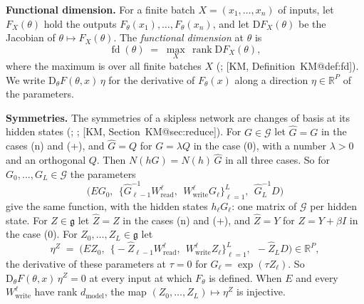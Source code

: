 \documentclass[10pt]{article}
\makeatletter
\theoremstyle{definition}
\theoremstyle{remark}
\newcommand{\R}{\mathbb{R}}
\newcommand{\Wread}{W_{\mathrm{read}}}
\newcommand{\Wwrite}{W_{\mathrm{write}}}
\newcommand{\dm}{d_{\mathrm{model}}}
\newcommand{\Der}{\mathrm{D}}
\newcommand{\G}{\mathcal{G}}
\newcommand{\para}[1]{\smallskip\noindent\textbf{#1}\hspace{0.5em}}
\newcommand{\KMn}[1]{\csname KM@#1\endcsname}
\newcommand{\KM}[2]{[KM, #1~\KMn{#2}]}
\makeatother
\begin{document}
\para{Functional dimension.} For a finite batch $X = (x_1, \dots, x_n)$ of inputs, let $F_X(\theta)$ hold the outputs $F_\theta(x_1), \dots, F_\theta(x_n)$, and let $\Der F_X(\theta)$ be the Jacobian of $\theta \mapsto F_X(\theta)$. The \emph{functional dimension} at $\theta$ is
\[
\operatorname{fd}(\theta) \;=\; \max_X\,\operatorname{rank}\Der F_X(\theta),
\]
where the maximum is over all finite batches $X$ (\citealp{grigsby2022functional}; \KM{Definition}{def:fd}). We write $\Der_\theta F(\theta, x)\,\eta$ for the derivative of $F_\theta(x)$ along a direction $\eta \in \R^P$ of the parameters.

\para{Symmetries.} The symmetries of a skipless network are changes of basis at its hidden states (\citealp{godfrey2022symmetries}; \citealp{zhao2023symmetries}; [KM, Section~\KMn{sec:reduce}]). For $G \in \G$ let $\widehat G = G$ in the cases (n) and (+), and $\widehat G = Q$ for $G = \lambda Q$ in the case (0), with a number $\lambda > 0$ and an orthogonal $Q$. Then $N(hG) = N(h)\,\widehat G$ in all three cases. So for $G_0, \dots, G_L \in \G$ the parameters
\[
\Big(EG_0,\ \ \big\{\widehat G_{\ell-1}^{-1}\Wread^{\ell},\ \ \Wwrite^{\ell}G_\ell\big\}_{\ell=1}^{L},\ \ \widehat G_L^{-1}D\Big)
\]
give the same function, with the hidden states $h_\ell G_\ell$: one matrix of $\G$ per hidden state. For $Z \in \mathfrak g$ let $\widehat Z = Z$ in the cases (n) and (+), and $\widehat Z = Y$ for $Z = Y + \beta I$ in the case (0). For $Z_0, \dots, Z_L \in \mathfrak g$ let
\begin{equation}\label{eq:e0eta}
\eta^{Z} \;=\; \Big(EZ_0,\ \ \big\{-\widehat Z_{\ell-1}\Wread^{\ell},\ \ \Wwrite^{\ell}Z_\ell\big\}_{\ell=1}^{L},\ \ -\widehat Z_LD\Big) \in \R^P ,
\end{equation}
the derivative of these parameters at $\tau = 0$ for $G_\ell = \exp(\tau Z_\ell)$. So $\Der_\theta F(\theta, x)\,\eta^{Z} = 0$ at every input at which $F_\theta$ is defined. When $E$ and every $\Wwrite^{\ell}$ have rank $\dm$, the map $(Z_0, \dots, Z_L) \mapsto \eta^{Z}$ is injective.
\end{document}
